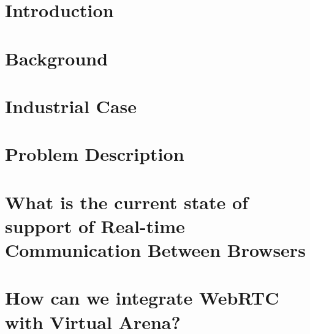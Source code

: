 \chapter{Introduction}

\chapter{Background}


%

%

\chapter{Industrial Case}


\chapter{Problem Description}




\chapter{What is the current state of support of Real-time Communication Between Browsers}


\chapter{How can we integrate WebRTC with Virtual Arena?}



